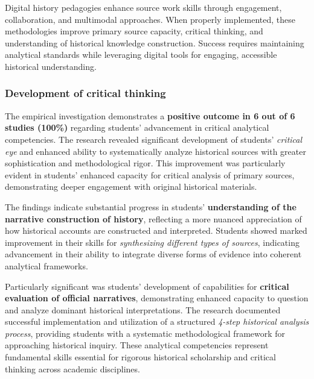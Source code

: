 \documentclass[
hf,
]{ceurart}
\begin{document}
Digital history pedagogies enhance source work skills through engagement, collaboration, and multimodal approaches. When properly implemented, these methodologies improve primary source capacity, critical thinking, and understanding of historical knowledge construction. Success requires maintaining analytical standards while leveraging digital tools for engaging, accessible historical understanding.

\subsubsection{Development of critical thinking}

The empirical investigation demonstrates a \textbf{positive outcome in 6 out of 6 studies (100\%)} regarding students' advancement in critical analytical competencies. The research revealed significant development of students' \textit{critical eye} and enhanced ability to systematically analyze historical sources with greater sophistication and methodological rigor. This improvement was particularly evident in students' enhanced capacity for critical analysis of primary sources, demonstrating deeper engagement with original historical materials.

The findings indicate substantial progress in students' \textbf{understanding of the narrative construction of history}, reflecting a more nuanced appreciation of how historical accounts are constructed and interpreted. Students showed marked improvement in their skills for \textit{synthesizing different types of sources}, indicating advancement in their ability to integrate diverse forms of evidence into coherent analytical frameworks.

Particularly significant was students' development of capabilities for \textbf{critical evaluation of official narratives}, demonstrating enhanced capacity to question and analyze dominant historical interpretations. The research documented successful implementation and utilization of a structured \textit{4-step historical analysis process}, providing students with a systematic methodological framework for approaching historical inquiry. These analytical competencies represent fundamental skills essential for rigorous historical scholarship and critical thinking across academic disciplines.
\end{document}
